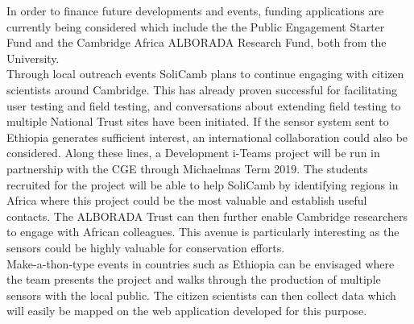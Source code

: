 In order to finance future developments and events, funding applications are currently being considered which include the the Public Engagement Starter Fund and the Cambridge Africa ALBORADA Research Fund, both from the University.\\

Through local outreach events SoliCamb plans to continue engaging with citizen scientists around Cambridge. This has already proven successful for facilitating user testing and field testing, and conversations about extending field testing to multiple National Trust sites have been initiated. If the sensor system sent to Ethiopia generates sufficient interest, an international collaboration could also be considered. Along these lines, a Development i-Teams project will be run in partnership with the \gls{CGE} through Michaelmas Term 2019. The students recruited for the project will be able to help SoliCamb by identifying regions in Africa where this project could be the most valuable and establish useful contacts. The ALBORADA Trust can then further enable Cambridge researchers to engage with African colleagues. This avenue is particularly interesting as the sensors could be highly valuable for conservation efforts. \\
Make-a-thon-type events in countries such as Ethiopia can be envisaged where the team presents the project and walks through the production of multiple sensors with the local public. The citizen scientists can then collect data which will easily be mapped on the web application developed for this purpose. 
